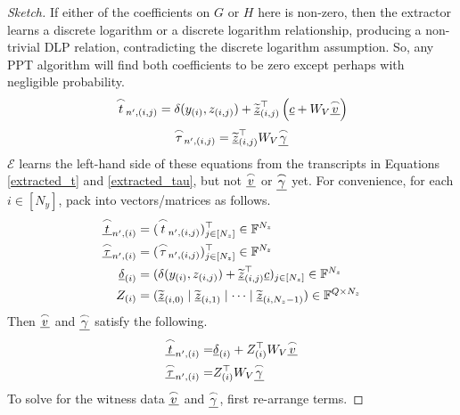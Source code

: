 \documentclass{article}
\theoremstyle{definition}
\newcommand{\FF}{\mathbb{F}}
\newcommand{\zq}{\widetilde{\underline{z}}}
\begin{document}
\begin{proof}[Sketch]
If either of the coefficients on $G$ or $H$ here is non-zero, then the extractor learns a discrete logarithm or a discrete logarithm relationship, producing a non-trivial DLP relation, contradicting the discrete logarithm assumption. So, any PPT algorithm will find both coefficients to be zero except perhaps with negligible probability.
\begin{align}
\overset{\LARGE \frown}{\small{t}}_{n^\prime,(i,j)} = \delta(y_{(i)},z_{(i,j)}) + \zq_{(i,j)}^\top\left( \underline{c} +  W_V \underline{\overset{\LARGE \frown}{\small{v}}}\right)
\label{eqn:onion}
\end{align}
$$\overset{\LARGE \frown}{\small{\tau}}_{n^\prime,(i,j)} = \zq^\top_{(i,j)} W_V \underline{\overset{\LARGE \frown}{\small{\gamma}}}$$
$\mathcal{E}$ learns the left-hand side of these equations from the transcripts in Equations \ref{extracted_t} and \ref{extracted_tau}, but not $\underline{\overset{\LARGE \frown}{\small{v}}}$ or $\underline{\overset{\LARGE \frown}{\small{\gamma}}}$ yet. For convenience, for each $i \in [N_y]$, pack into vectors/matrices as follows.
\begin{align*}
    \underline{\overset{\LARGE \frown}{\small{t}}}_{n^\prime, (i)} &= (\overset{\LARGE \frown}{\small{t}}_{n^\prime, (i,j)})^\top_{j \in [N_z]} \in \FF^{N_z} \\
    \underline{\overset{\LARGE \frown}{\small{\tau}}}_{n^\prime, (i)} &= (\overset{\LARGE \frown}{\small{\tau}}_{n^\prime, (i,j)})^\top_{j \in [N_z]} \in \FF^{N_z} \\
    \underline{\delta}_{(i)} &= (\delta(y_{(i)}, z_{(i,j)}) + \zq^\top_{(i,j)} \underline{c})_{j \in [N_z]} \in \FF^{N_z} \\
    Z_{(i)} &= (\zq_{(i,0)} \mid \zq_{(i,1)} \mid \cdots \mid \zq_{(i,N_z-1)}) \in \mathbb{F}^{Q \times N_z} 
\end{align*}
Then $\underline{\overset{\LARGE \frown}{\small{v}}}$ and $\underline{\overset{\LARGE \frown}{\small{\gamma}}}$ satisfy the following.
\begin{align*}
\underline{\overset{\LARGE \frown}{\small{t}}}_{n^\prime, (i)} =& \underline{\delta}_{(i)} + Z^\top_{(i)}W_V\underline{\overset{\LARGE \frown}{\small{v}}} \\
\underline{\overset{\LARGE \frown}{\small{\tau}}}_{n^\prime, (i)} =& Z^\top_{(i)} W_V\underline{\overset{\LARGE \frown}{\small{\gamma}}}
\end{align*}
To solve for the witness data $\underline{\overset{\LARGE \frown}{\small{v}}}$ and $\underline{\overset{\LARGE \frown}{\small{\gamma}}}$, first re-arrange terms.

\end{proof}
\end{document}
